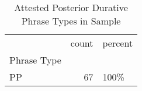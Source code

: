 \begin{table}[htbp!]
\centering
\caption{Attested Posterior Durative Phrase Types in Sample}
\label{table:postdur_phtype_ct}
\begin{tabular}{lrl}
\toprule
{} &  count & percent \\
Phrase Type &        &         \\
\midrule
PP          &     67 &    100\% \\
\bottomrule
\end{tabular}
\end{table}
